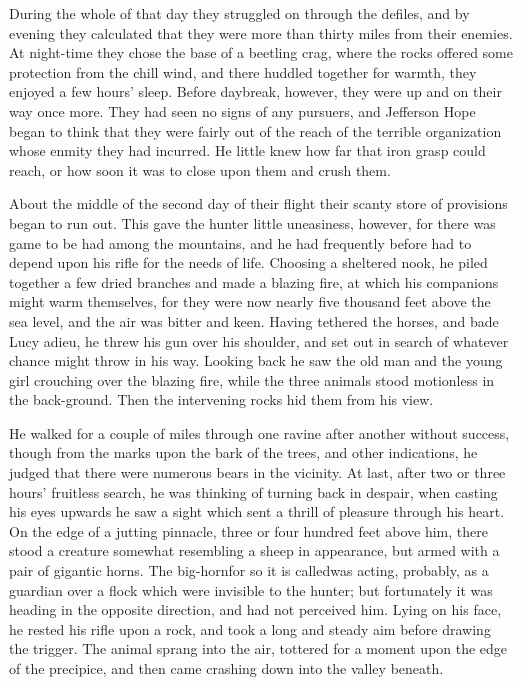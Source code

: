 \documentclass[12pt,english]{book}
\begin{document}
During the whole of that day they struggled on through the defiles,
and by evening they calculated that they were more than thirty miles
from their enemies. At night-time they chose the base of a beetling
crag, where the rocks offered some protection from the chill wind,
and there huddled together for warmth, they enjoyed a few hours' sleep.
Before daybreak, however, they were up and on their way once more.
They had seen no signs of any pursuers, and Jefferson Hope began to
think that they were fairly out of the reach of the terrible organization
whose enmity they had incurred. He little knew how far that iron grasp
could reach, or how soon it was to close upon them and crush them.

About the middle of the second day of their flight their scanty store
of provisions began to run out. This gave the hunter little uneasiness,
however, for there was game to be had among the mountains, and he
had frequently before had to depend upon his rifle for the needs of
life. Choosing a sheltered nook, he piled together a few dried branches
and made a blazing fire, at which his companions might warm themselves,
for they were now nearly five thousand feet above the sea level, and
the air was bitter and keen. Having tethered the horses, and bade
Lucy adieu, he threw his gun over his shoulder, and set out in search
of whatever chance might throw in his way. Looking back he saw the
old man and the young girl crouching over the blazing fire, while
the three animals stood motionless in the back-ground. Then the intervening
rocks hid them from his view.

He walked for a couple of miles through one ravine after another without
success, though from the marks upon the bark of the trees, and other
indications, he judged that there were numerous bears in the vicinity.
At last, after two or three hours' fruitless search, he was thinking
of turning back in despair, when casting his eyes upwards he saw a
sight which sent a thrill of pleasure through his heart. On the edge
of a jutting pinnacle, three or four hundred feet above him, there
stood a creature somewhat resembling a sheep in appearance, but armed
with a pair of gigantic horns. The big-horn\mdsh{---}for so it is
called\mdsh{---}was acting, probably, as a guardian over a flock
which were invisible to the hunter; but fortunately it was heading
in the opposite direction, and had not perceived him. Lying on his
face, he rested his rifle upon a rock, and took a long and steady
aim before drawing the trigger. The animal sprang into the air, tottered
for a moment upon the edge of the precipice, and then came crashing
down into the valley beneath.
\end{document}
